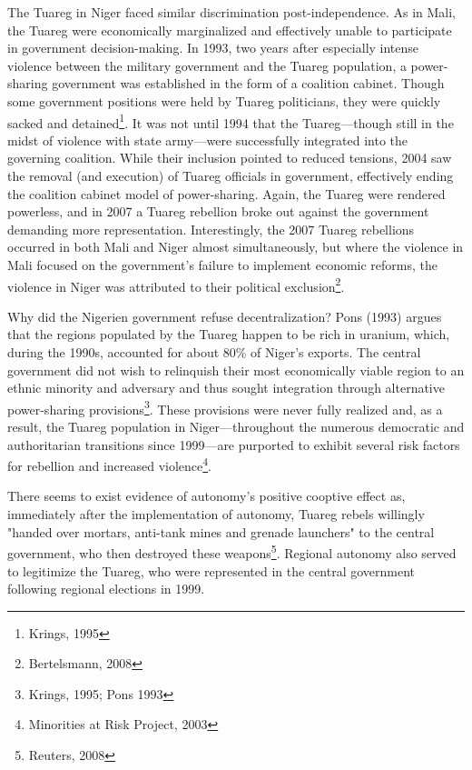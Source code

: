 \documentclass[12pt]{article}
\begin{document}
The Tuareg in Niger faced similar discrimination post-independence. As in Mali, the Tuareg were economically marginalized and effectively unable to participate in government decision-making. In 1993, two years after especially intense violence between the military government and the Tuareg population, a power-sharing government was established in the form of a coalition cabinet. Though some government positions were held by Tuareg politicians, they were quickly sacked and detained\footnote{Krings, 1995}. It was not until 1994 that the Tuareg---though still in the midst of violence with state army---were successfully integrated into the governing coalition. While their inclusion pointed to reduced tensions, 2004 saw the removal (and execution) of Tuareg officials in government, effectively ending the coalition cabinet model of power-sharing. Again, the Tuareg were rendered powerless, and in 2007 a Tuareg rebellion broke out against the government demanding more representation. Interestingly, the 2007 Tuareg rebellions occurred in both Mali and Niger almost simultaneously, but where the violence in Mali focused on the government's failure to implement economic reforms, the violence in Niger was attributed to their political exclusion\footnote{Bertelsmann, 2008}. 

Why did the Nigerien government refuse decentralization? Pons (1993) argues that the regions populated by the Tuareg happen to be rich in uranium, which, during the 1990s, accounted for about 80\% of Niger's exports. The central government did not wish to relinquish their most economically viable region to an ethnic minority and adversary and thus sought integration through alternative power-sharing provisions\footnote{Krings, 1995; Pons 1993}. These provisions were never fully realized and, as a result, the Tuareg population in Niger---throughout the numerous democratic and authoritarian transitions since 1999---are purported to exhibit several risk factors for rebellion and increased violence\footnote{Minorities at Risk Project, 2003}. 

There seems to exist evidence of autonomy's positive cooptive effect as, immediately after the implementation of autonomy, Tuareg rebels willingly "handed over mortars, anti-tank mines and grenade launchers" to the central government, who then destroyed these weapons\footnote{Reuters, 2008}.  Regional autonomy also served to legitimize the Tuareg, who were represented in the central government following regional elections in 1999. 
\end{document}
